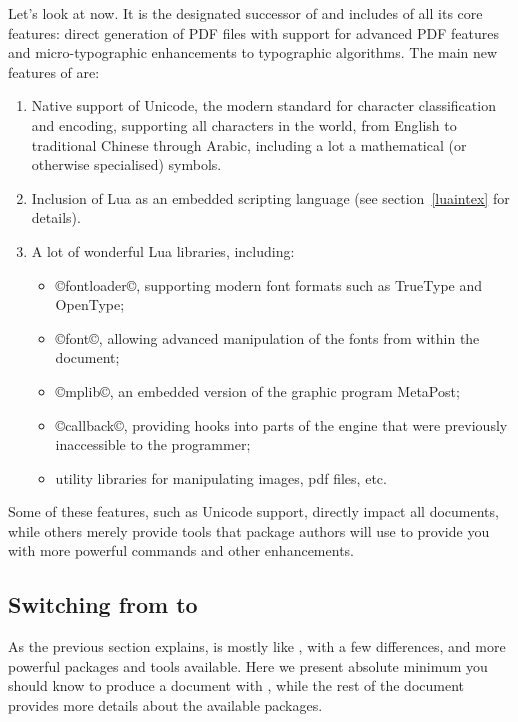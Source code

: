 \documentclass{lltxdoc}
\begin{document}
Let's look at \luatex now. It is the designated successor of \pdftex and
includes of all its core features: direct generation of PDF files with support
for advanced PDF features and micro-typographic enhancements to \tex
typographic algorithms. The main new features of \luatex are:
\begin{enumerate}
  \item Native support of Unicode, the modern standard for character
    classification and encoding, supporting all characters in the world, from
    English to traditional Chinese through Arabic, including a lot a
    mathematical (or otherwise specialised) symbols.
  \item Inclusion of Lua as an embedded scripting language (see
    section~\ref{luaintex} for details).
  \item A lot of wonderful Lua libraries, including:
    \begin{itemize}
      \item ©fontloader©, supporting modern font formats such as
        TrueType and OpenType;
      \item ©font©, allowing advanced manipulation of the fonts
        from within the document;
      \item ©mplib©, an embedded version of the graphic program MetaPost;
      \item ©callback©, providing hooks into parts of the \tex engine that
        were previously inaccessible to the programmer;
      \item utility libraries for manipulating images, pdf files, etc.
    \end{itemize}
\end{enumerate}
Some of these features, such as Unicode support, directly impact all
documents, while others merely provide tools that package authors will use to
provide you with more powerful commands and other enhancements.

\subsection{Switching from \latex to \lualatex}\label{switch}

As the previous section explains, \lualatex is mostly like \latex, with a few
differences, and more powerful packages and tools available. Here we present
absolute minimum you should know to produce a document with \lualatex, while
the rest of the document provides more details about the available packages.
\end{document}
